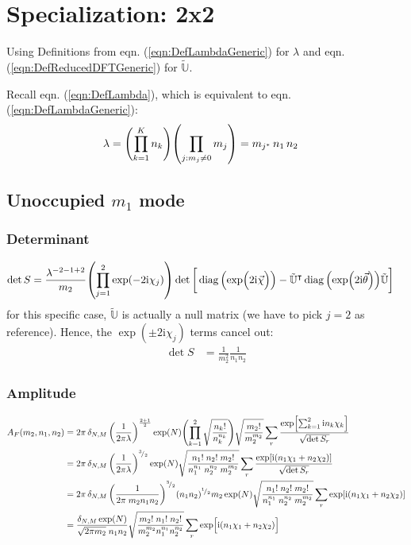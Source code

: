 \documentclass[
	english,
	a4paper,
	fontsize=10pt,
	parskip=half,
	titlepage=true,
	DIV=12,
	final
]{scrreprt}
\newcommand*{\smallfrac}  [2]{\ensuremath{{}^        {#1} \!/_        {#2}}}
\newcommand*{\transp}{\ensuremath{^\intercal}}
\newcommand*{\iunit}{\ensuremath{\mathrm{i}}}
\DeclareMathOperator{\diag}{diag}
\begin{document}
\section{Specialization: 2x2}
Using Definitions from eqn. (\ref{eqn:DefLambdaGeneric}) for $\lambda$ and eqn. (\ref{eqn:DefReducedDFTGeneric}) for $\tilde{\mathbb{U}}$.

Recall eqn. (\ref{eqn:DefLambda}), which is equivalent to eqn. (\ref{eqn:DefLambdaGeneric}):
\begin{align*}
	\lambda
&=
	\qty( \prod_{k=1}^{K}   n_k )
	\qty( \prod_{j : m_j \neq 0} m_j )
=
	m_{j^*} \, n_1 \, n_2
\end{align*}

\subsection{Unoccupied $m_1$ mode}
\subsubsection{Determinant}
\begin{align}
	\det S
&=
	\frac{ \lambda^{-2 - 1 + 2} }{ m_2 }
	\qty( \prod_{j=1}^{2} \exp(-2\iunit \chi_j) )
	\det\qty[\bigg.
		\diag\qty(\exp(\Big.2\iunit\vec{\chi}))
		-
		\tilde{\mathbb{U}}\transp
		\diag\qty(\exp(2\iunit\vec{\theta}))
		\tilde{\mathbb{U}}
	]
\end{align}
for this specific case, $\tilde{\mathbb{U}}$ is actually a null matrix (we have to pick $j=2$ as reference). Hence, the 
$\exp(\pm 2\iunit \chi_j)$ terms cancel out:
\begin{align}
	\det S
&=
	\frac{1}{m_2^{2}}
	\frac{1}{n_1 n_2}
\end{align}

\subsubsection{Amplitude}
\begin{align}
	A_F(m_2, n_1, n_2)
&=
	2\pi \, \delta_{N,M} \, \qty(
		\frac{1}{2\pi\lambda}
	)^{\frac{2 + 1}{2}}
	\exp(N)
	\qty( \prod_{k=1}^{2}
		\sqrt{\frac
			{ n_k! }
			{ n_k^{n_k} }
	})
		\sqrt{\frac
			{ m_2! }
			{ m_2^{m_2} }
	}
	\sum_r
		\frac
		{\exp[ \sum_{k=1}^{2} \iunit n_k \chi_k]}
		{\sqrt{\det S_r}} \\
&=
	2\pi \, \delta_{N,M} \, \qty(
		\frac{1}{2\pi\lambda}
	)^{\smallfrac{3}{2}}
	\exp(N)
		\sqrt{\frac
			{ n_1! \; n_2! \; m_2! }
			{ n_1^{n_1} \; n_2^{n_2} \; m_2^{m_2}}
	}
	\sum_r
		\frac
		{\exp[
			\iunit ( n_1 \chi_1 + n_2 \chi_2 )
		]}
		{\sqrt{\det S_r}}
	\\
&=
	2\pi \, \delta_{N,M} \, \qty(
		\frac{1}{2\pi \; m_2 n_1 n_2}
	)^{\smallfrac{3}{2}}
	(n_1 n_2)^{\smallfrac{1}{2}} m_2
	\exp(N)
	\sqrt{\frac
		{ n_1! \; n_2! \; m_2! }
		{ n_1^{n_1} \; n_2^{n_2} \; m_2^{m_2}}
	}
	\sum_r
		\exp[
			\iunit ( n_1 \chi_1 + n_2 \chi_2 )
		] \\
&=
	\frac
		{ \delta_{N,M} \exp(N) }
		{ \sqrt{2\pi m_2} \; n_1 n_2 }
	\sqrt{\frac
		{ m_2! \; n_1! \; n_2! }
		{ m_2^{m_2} n_1^{n_1} n_2^{n_2} }
	}
	\sum_r
		\exp[ \Big.
			\iunit \qty(  
			n_1 \chi_1 + n_2 \chi_2)
		]
\end{align}
\end{document}
